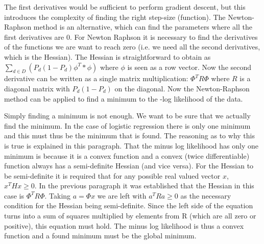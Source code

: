 \documentclass{scrartcl}
\begin{document}
The first derivatives would be sufficient to perform gradient descent, but this introduces the complexity of finding the right step-size (function). The Newton-Raphson method is an alternative, which can find the parameters where all the first derivatives are 0. For Newton Raphson it is necessary to find the derivatives of the functions we are want to reach zero (i.e. we need all the second derivatives, which is the Hessian). The Hessian is straightforward to obtain as $\sum_{d \in D}(P_{d} (1-P_{d}) \phi^{T}*\phi)$ where $\phi$ is seen as a row vector. Now the second derivative can be written as a single matrix multiplication: $\Phi^{T} R \Phi$ where $R$ is a diagonal matrix with $P_{d} (1-P_{d})$ on the diagonal. Now the Newton-Raphson method can be applied to find a minimum to the -log likelihood of the data.

Simply finding a minimum is not enough. We want to be sure that we actually find the minimum. In the case of logistic regression there is only one minimum and this must thus be the minimum that is found. The reasoning as to why this is true is explained in this paragraph. That the minus log likelihood has only one minimum is because it is a convex function and a convex (twice differentiable) function always has a semi-definite Hessian (and vice versa). For the Hessian to be semi-definite it is required that for any possible real valued vector $x$, $x^{T}Hx\geq 0$. In the previous paragraph it was established that the Hessian in this case is $\Phi^{T} R \Phi$. Taking $a=\Phi x$ we are left with $a^{T}Ra\geq 0$ as the necessary condition for the Hessian being semi-definite. Since the left side of the equation turns into a sum of squares multiplied by elements from R (which are all zero or positive), this equation must hold. The minus log likelihood is thus a convex function and a found minimum must be the global minimum.
\end{document}
